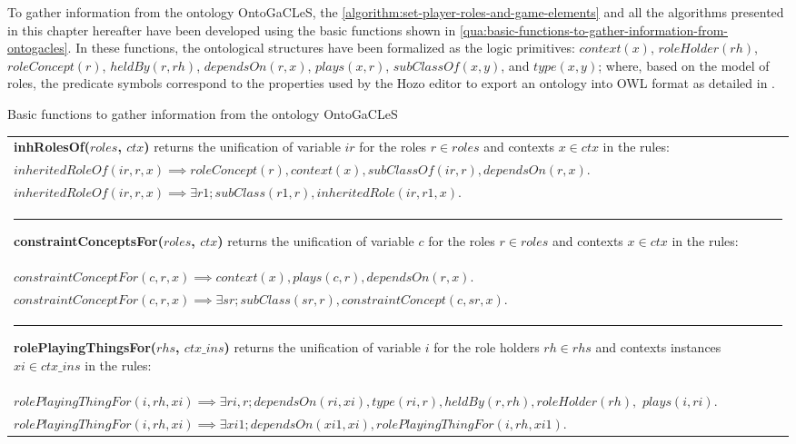 To gather information from the ontology OntoGaCLeS, the \autoref{algorithm:set-player-roles-and-game-elements} and all the algorithms presented in this chapter hereafter have been developed using the basic functions shown in \autoref{qua:basic-functions-to-gather-information-from-ontogacles}.
In these functions, the ontological structures have been formalized as the logic primitives: $context(x)$, $roleHolder(rh)$, $roleConcept(r)$, $heldBy(r,rh)$, $dependsOn(r,x)$, $plays(x,r)$, $subClassOf(x,y)$, and $type(x,y)$;
where, based on the model of roles, the predicate symbols correspond to the properties used by the Hozo editor to export an ontology into OWL format as detailed in \cite{KozakiSunagawaKitamuraMizoguchi2007}.

\begin{quadro}[htb]
\caption{Basic functions to gather information from the ontology OntoGaCLeS}
\label{qua:basic-functions-to-gather-information-from-ontogacles}
\centering
\begin{scriptsize}
\begin{tabular}{|p{15cm}|}

\toprule
\textbf{inhRolesOf($roles$, $ctx$)} returns the unification of variable $ir$ for the roles $r \in roles$ and contexts $x \in ctx$ in the rules:  \\
$inheritedRoleOf(ir,r,x) \implies roleConcept(r), context(x), subClassOf(ir,r), dependsOn(r,x).$\\
$inheritedRoleOf(ir,r,x) \implies \exists r1; subClass(r1,r), inheritedRole(ir,r1,x).$\\

\hrule
\textbf{constraintConceptsFor($roles$, $ctx$)} returns the unification of variable $c$ for the roles $r \in roles$ and contexts $x \in ctx$ in the rules:\\
$constraintConceptFor(c,r,x) \implies context(x), plays(c,r), dependsOn(r,x).$\\
$constraintConceptFor(c,r,x) \implies \exists sr; subClass(sr,r), constraintConcept(c,sr,x).$\\

\hrule
\textbf{rolePlayingThingsFor($rhs$, $ctx\_ins$)} returns the unification of variable $i$ for the role holders $rh \in rhs$ and contexts instances $xi \in ctx\_ins$ in the rules:\\
$rolePlayingThingFor(i,rh,xi) \implies \exists ri,r; dependsOn(ri,xi), type(ri,r), heldBy(r,rh), roleHolder(rh),$ $plays(i,ri).$\\
$rolePlayingThingFor(i,rh,xi) \implies \exists xi1; dependsOn(xi1, xi), rolePlayingThingFor(i,rh,xi1).$\\



\end{tabular}
\end{scriptsize}
\end{quadro}
